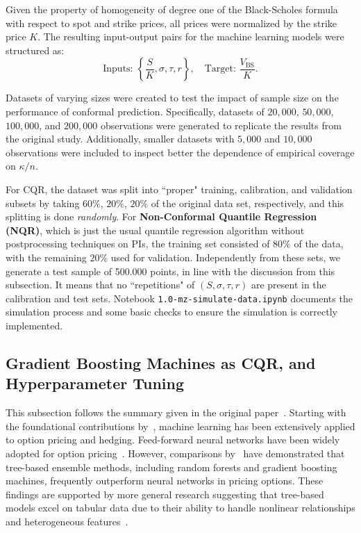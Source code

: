 \documentclass{article}
\theoremstyle{definition}
\begin{document}
Given the property of homogeneity of degree one of the Black-Scholes formula with respect to spot and strike prices, all prices were normalized by the strike price $K$. The resulting input-output pairs for the machine learning models were structured as:
\begin{equation}
\label{eq:inputs}
\text{Inputs: } \left\{ \frac{S}{K}, \sigma, \tau, r \right\}, \quad \text{Target: } \frac{V_{\text{BS}}}{K}.
\end{equation}

Datasets of varying sizes were created to test the impact of sample size on the performance of conformal prediction. Specifically, datasets of $20,000$, $50,000$, $100,000$, and $200,000$ observations were generated to replicate the results from the original study. Additionally, smaller datasets with $5,000$ and $10,000$ observations were included to inspect better the dependence of empirical coverage on $\kappa / n$.

For CQR, the dataset was split into ``proper" training, calibration, and validation subsets by taking $60\%$, $20\%$, $20\%$ of the original data set, respectively, and this splitting is done \emph{randomly}. For \textbf{Non-Conformal Quantile Regression (NQR)}, which is just the usual quantile regression algorithm without postprocessing techniques on PIs, the training set consisted of $80\%$ of the data, with the remaining $20\%$ used for validation. Independently from these sets, we generate a test sample of 500.000 points, in line with the discussion from this subsection. It means that no ``repetitions" of $(S, \sigma, \tau, r)$ are present in the calibration and test sets. Notebook \texttt{1.0-mz-simulate-data.ipynb} documents the simulation process and some basic checks to ensure the simulation is correctly implemented.

\subsection{Gradient Boosting Machines as CQR, and Hyperparameter Tuning}
This subsection follows the summary given in the original paper~\cite{bastos}. Starting with the foundational contributions by~\cite{hutchinson1994, malliaris1993}, machine learning has been extensively applied to option pricing and hedging. Feed-forward neural networks have been widely adopted for option pricing~\cite{anders1998, andreou2010, garcia2000}. However, comparisons by~\cite{ivascu2021} have demonstrated that tree-based ensemble methods, including random forests and gradient boosting machines, frequently outperform neural networks in pricing options. These findings are supported by more general research suggesting that tree-based models excel on tabular data due to their ability to handle nonlinear relationships and heterogeneous features~\cite{grinsztajn2022}.
\end{document}
